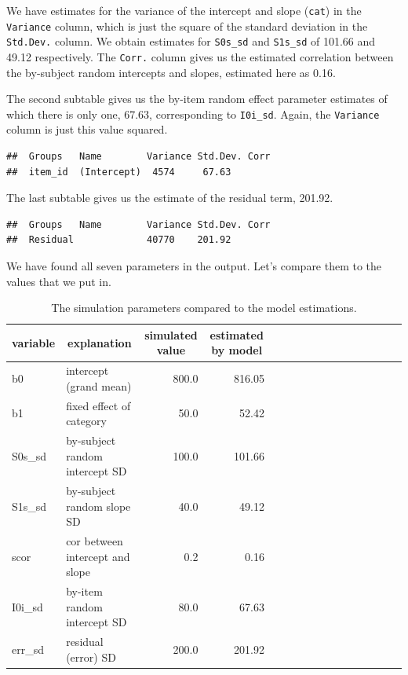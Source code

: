 \documentclass[doc,floatsintext]{apa6}
\begin{document}
\noindent We have estimates for the variance of the intercept and slope (\texttt{cat}) in the \texttt{Variance} column, which is just the square of the standard deviation in the \texttt{Std.Dev.} column. We obtain estimates for \texttt{S0s\_sd} and \texttt{S1s\_sd} of 101.66 and 49.12 respectively. The \texttt{Corr.} column gives us the estimated correlation between the by-subject random intercepts and slopes, estimated here as 0.16.

The second subtable gives us the by-item random effect parameter estimates of which there is only one, 67.63, corresponding to \texttt{I0i\_sd}. Again, the \texttt{Variance} column is just this value squared.

\begin{verbatim}
##  Groups   Name        Variance Std.Dev. Corr
##  item_id  (Intercept)  4574     67.63
\end{verbatim}

The last subtable gives us the estimate of the residual term, 201.92.

\begin{verbatim}
##  Groups   Name        Variance Std.Dev. Corr
##  Residual             40770    201.92
\end{verbatim}

We have found all seven parameters in the output. Let's compare them to the values that we put in.

\begin{table}[H]
\begin{center}
\begin{threeparttable}
\caption{\label{tab:param-compare}The simulation parameters compared to the model estimations.}
\begin{tabular}{llrrllrrllrrllrr}
\toprule
variable & \multicolumn{1}{c}{explanation} & \multicolumn{1}{c}{simulated value} & \multicolumn{1}{c}{estimated by model}\\
\midrule
b0 & intercept (grand mean) & 800.0 & 816.05\\
b1 & fixed effect of category & 50.0 & 52.42\\
S0s\_sd & by-subject random intercept SD & 100.0 & 101.66\\
S1s\_sd & by-subject random slope SD & 40.0 & 49.12\\
scor & cor between intercept and slope & 0.2 & 0.16\\
I0i\_sd & by-item random intercept SD & 80.0 & 67.63\\
err\_sd & residual (error) SD & 200.0 & 201.92\\
\bottomrule
\end{tabular}
\end{threeparttable}
\end{center}
\end{table}
\end{document}
